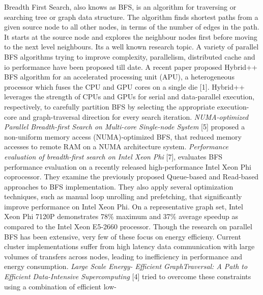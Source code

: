 Breadth First Search, also knows as BFS, is an algorithm for traversing
or searching tree or graph data structure. The algorithm finds shortest paths
from a given source node to all other nodes, in
terms of the number of edges in the path. It starts at the source node and
explores the neighbour nodes first before moving to the next level neighbours.
Its a well known research topic. A variety of parallel BFS algorithms trying to
improve complexity, parallelism, distributed cache and io performance have been
proposed till date.\newline
A recent paper proposed Hybrid++ BFS algorithm for an accelerated processing
unit (APU), a heterogeneous processor which fuses the CPU and GPU cores on a
single die [1]. Hybrid++ leverages the strength of CPUs and GPUs for serial and
data-parallel execution, respectively, to carefully partition BFS by selecting
the appropriate execution-core and graph-traversal direction for every search
iteration.\newline
\emph{NUMA-optimized Parallel Breadth-first Search on Multi-core Single-node
System} [5] proposed a non-uniform memory access (NUMA)-optimized BFS, that
reduced memory accesses to remote RAM on a NUMA architecture system.\newline
\emph{Performance evaluation of breadth-first search on Intel Xeon Phi} [7],
evaluates BFS performance evaluation on a recently released high-performance
Intel Xeon Phi coprocessor. They examine the previously proposed Queue-based
and Read-based approaches to BFS implementation. They also apply several
optimization techniques, such as manual loop unrolling and prefetching, that
significantly improve performance on Intel Xeon Phi. On a representative graph
set, Intel Xeon Phi 7120P demonstrates 78\% maximum and 37\% average speedup as
compared to the Intel Xeon E5-2660 processor.\newline
Though the research on parallel BFS has been extensive, very few of these focus
on energy efficieny.\newline
Current cluster implementations suffer from high latency data
communication with large volumes of transfers across nodes, leading to
inefficiency in performance and energy consumption. \emph{Large Scale Energy-
Efficient GraphTraversal: A Path to Efficient Data-Intensive Supercomputing}
[4] tried to overcome these constraints using a combination of efficient low-
